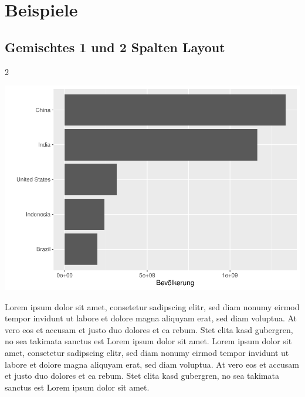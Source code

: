 \documentclass[
  a4paper,
  twoside]{article}
\begin{document}
\newpage

\hypertarget{beispiele-1}{%
\section{Beispiele}\label{beispiele-1}}

\hypertarget{gemischtes-1-und-2-spalten-layout}{%
\subsection{Gemischtes 1 und 2 Spalten Layout}\label{gemischtes-1-und-2-spalten-layout}}

\begin {multicols}{2}

\includegraphics[width=1\linewidth]{PDF_Latex_files/figure-latex/unnamed-chunk-4-1}

Lorem ipsum dolor sit amet, consetetur sadipscing elitr, sed diam nonumy eirmod tempor invidunt ut labore et dolore magna aliquyam erat, sed diam voluptua. At vero eos et accusam et justo duo dolores et ea rebum. Stet clita kasd gubergren, no sea takimata sanctus est Lorem ipsum dolor sit amet. Lorem ipsum dolor sit amet, consetetur sadipscing elitr, sed diam nonumy eirmod tempor invidunt ut labore et dolore magna aliquyam erat, sed diam voluptua. At vero eos et accusam et justo duo dolores et ea rebum. Stet clita kasd gubergren, no sea takimata sanctus est Lorem ipsum dolor sit amet.
\columnbreak


\end{multicols}
\end{document}
